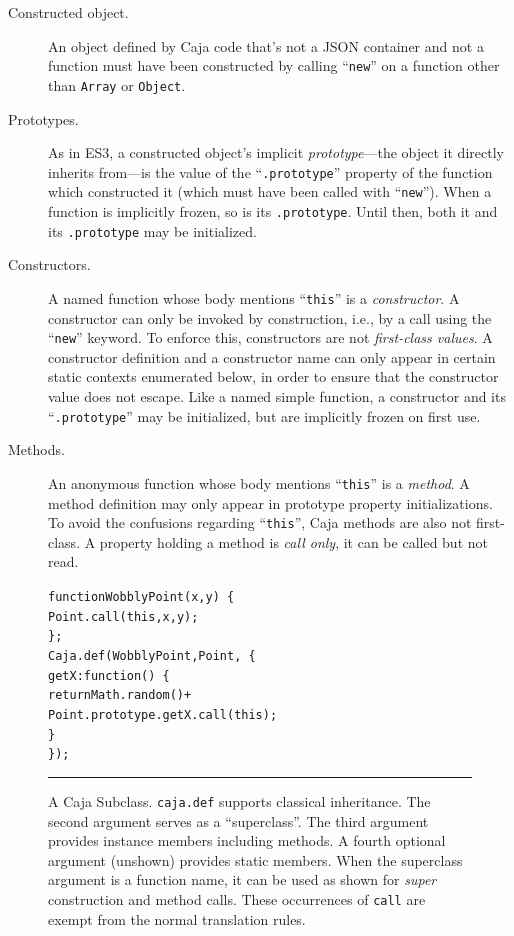\documentclass[letterpaper,twocolumn,10pt]{article}
\newcommand{\code}[1]{{\tt {#1}}}              %
\begin{document}
\begin{description}

  \item[Constructed object.] An object defined by Caja code that's not a JSON 
  container and not a function must have been constructed by calling 
  ``\code{new}'' on a function other than \code{Array} or \code{Object}. 

  \item[Prototypes.] As in ES3, a constructed object's implicit 
  \emph{prototype}---the object it directly inherits from---is the value of 
  the ``\code{.prototype}'' property of the function which constructed it 
  (which must have been called with ``\code{new}''). When a function is 
  implicitly frozen, so is its \code{.prototype}. Until then, both it and its 
  \code{.prototype} may be initialized. 

  \item[Constructors.] A named function whose body mentions ``\code{this}'' 
  is a \emph{constructor}. A constructor can only be invoked by construction, 
  i.e., by a call using the ``\code{new}'' keyword. To enforce this, 
  constructors are not \emph{first-class values}. A constructor definition 
  and a constructor name can only appear in certain static contexts 
  enumerated below, in order to ensure that the constructor value does not 
  escape. Like a named simple function, a constructor and its 
  ``\code{.prototype}'' may be initialized, but are implicitly frozen on 
  first use. 
    
  \item[Methods.] An anonymous function whose body mentions ``\code{this}'' 
  is a \emph{method}. A method definition may only appear in prototype 
  property initializations. To avoid the confusions regarding 
  ``\code{this}'', Caja methods are also not first-class. A property holding 
  a method is \emph{call only}, it can be called but not read.
  
\end{description}


\begin{figure}[t!]
\begin{alltt}
function WobblyPoint(x, y)\ \{
  Point.call(this, x, y);
\};
Caja.def(WobblyPoint, Point,\ \{
  getX: function()\ \{ 
    return Math.random() +
      Point.prototype.getX.call(this); 
  \}
\});
\end{alltt}

\caption[A Caja Subclass.]{A Caja Subclass. \code{caja.def} supports 
classical inheritance. The second argument serves as a ``superclass''. The 
third argument provides instance members including methods. A fourth optional 
argument (unshown) provides static members. When the superclass argument is a 
function name, it can be used as shown for \emph{super} construction and 
method calls. These occurrences of \code{call} are exempt from the normal 
translation rules. \\ } \hrule
\label{fig:caja-subclass}
\end{figure}
\end{document}
